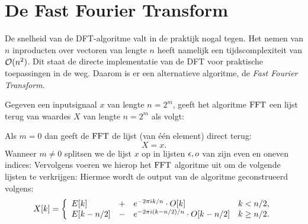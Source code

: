 \section{De Fast Fourier Transform}
\label{fft_sec}
De snelheid van de DFT-algoritme valt in de praktijk nogal tegen. Het nemen van $n$ inproducten over vectoren 
van lengte $n$ heeft namelijk een tijdscomplexiteit van $\mathcal{O}(n^2)$. Dit staat de directe implementatie van de DFT 
voor praktische toepassingen in de weg. Daarom is er een alternatieve algoritme, de \emph{Fast Fourier Transform}.

\begin{algo}
Gegeven een inputsignaal $x$ van lengte $n=2^m$, geeft het algoritme $\text{FFT}$ 
een lijst terug van waardes $X$ van lengte $n=2^m$ als volgt:

Als $m=0$ dan geeft de $\text{FFT}$ de lijst (van \'e\'en element) direct terug:
\[
X = x.
\]
Wanneer $m\neq0$ splitsen we de lijst $x$ op in lijsten $\epsilon,o$ van zijn even en oneven indices:
Vervolgens voeren we hierop het $\text{FFT}$ algoritme uit om de volgende lijsten te verkrijgen:
Hiermee wordt de output van de algoritme geconstrueerd volgens:
\[
  X[k] = \left\{\begin{array}{llll}
    E[k]         &+& e^{-{2\pi i} k/n}\cdot O[k] &  k< n/2, \\
    E[k-n/2] &-& e^{-{2\pi i} (k-n/2)/n}\cdot O[k-n/2] &  k\geq n/2.
  \end{array}\right.
\]
\end{algo}

